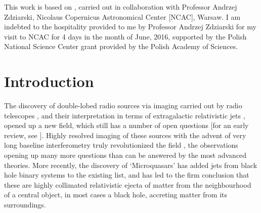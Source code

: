 \begin{checkit}
This work is based on \cite{Zdziarski_et_al.-2016-MNRAS}, carried out in collaboration with Professor Andrzej Zdziarski, Nicolaus Copernicus Astronomical Center [NCAC], Warsaw. I am indebted to the hospitality provided to me by Professor Andrzej Zdziarski for my visit to NCAC for 4 days in the month of June, 2016, supported by the Polish National Science Center grant provided by the Polish Academy of Sciences.
\end{checkit}

\section{Introduction}
\label{sec:introduction--jet_model}
The discovery of double-lobed radio sources via imaging carried out by radio telescopes \citep{MacDonald_et_al.-1968-MNRAS, Mackay-1969-MNRAS, Branson_et_al.-1972-MNRAS, Hargrave-1974-MNRAS, Hargrave_&_Ryle-1974-MNRAS, Fanaroff_&_Riley-1974-MNRAS}, and their interpretation in terms of extragalactic relativistic jets \citep{Longair_et_al.-1973-MNRAS, Blandford_&_Rees-1974-MNRAS,Scheuer-1974-MNRAS}, opened up a new field, which still has a number of open questions [for an early review, see \cite{Begelman_et_al.-1984-RevModPhys}]. Highly resolved imaging of these sources with the advent of very long baseline interferometry truly revolutionized the field \citep{Biretta_et_al.-1986-ApJ,Marscher-1988-ApJ, Reid_et_al.-1989-ApJ}, the observations opening up many more questions than can be answered by the most advanced theories. More recently, the discovery of `Microquasars' \citep{Mirabel_&_Rodriguez-1992-Nature, Mirabel_&_Rodriguez-1994-Nature, Mirabel_&_Rodriguez-1998-Nature} has added jets from black hole binary systems to the existing list, and has led to the firm conclusion that these are highly collimated relativistic \citep{Ryle_&_Longair-1967-MNRAS, Blandford_et_al.-1977-Nature} ejecta of matter from the neighbourhood of a central object, in most cases a black hole, accreting matter from its surroundings.

